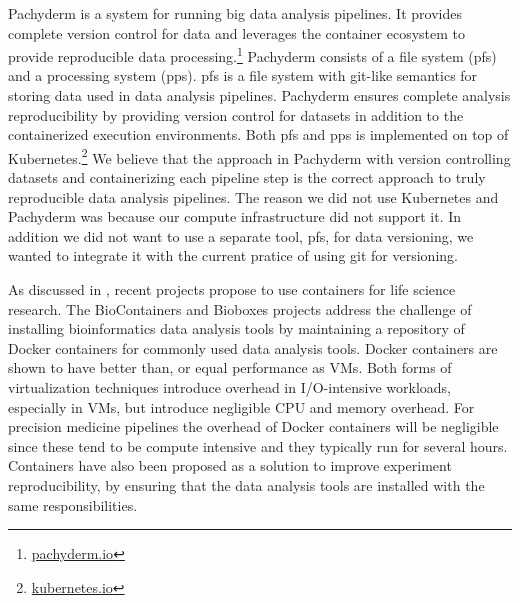 Pachyderm is a system for running  big data analysis pipelines. It provides
complete version control for data and leverages the container ecosystem to
provide reproducible data processing.\footnote{\url{pachyderm.io}} Pachyderm
consists of a file system (\gls{pfs}) and a processing system (\gls{pps}).
\gls{pfs} is a file system with git-like semantics for storing data used
in data analysis pipelines. Pachyderm ensures complete analysis reproducibility
by providing version control for datasets in addition to the containerized
execution environments. Both \gls{pfs} and \gls{pps} is implemented on top
of Kubernetes.\footnote{\url{kubernetes.io}} We believe that the approach in
Pachyderm with version controlling datasets and containerizing each pipeline
step is the correct approach to truly reproducible data analysis pipelines. 
The reason we did not use Kubernetes and Pachyderm was because our compute
infrastructure did not support it. In addition we did not want to use a separate
tool, \gls{pfs}, for data versioning, we wanted to integrate it with the current
pratice of using git for versioning. 

As discussed in \cite{NIK}, recent projects propose to use containers for life
science research. 
The BioContainers\cite{biocontainers} and Bioboxes\cite{belmann2015bioboxes}
projects address the challenge of installing bioinformatics data analysis
tools by maintaining a repository of Docker containers for commonly used data
analysis tools. Docker containers are shown to have better than, or equal
performance as VMs.\cite{di2015impact} Both forms of virtualization techniques
introduce overhead in I/O-intensive workloads, especially in VMs, but introduce
negligible CPU and memory overhead. For precision medicine pipelines the
overhead of Docker containers will be negligible since these tend to be compute
intensive and they typically run for several hours. \cite{di2015impact}
Containers have also been proposed as a solution to improve experiment
reproducibility, by ensuring that the data analysis tools are installed with the
same responsibilities.\cite{boettiger2015introduction} 


